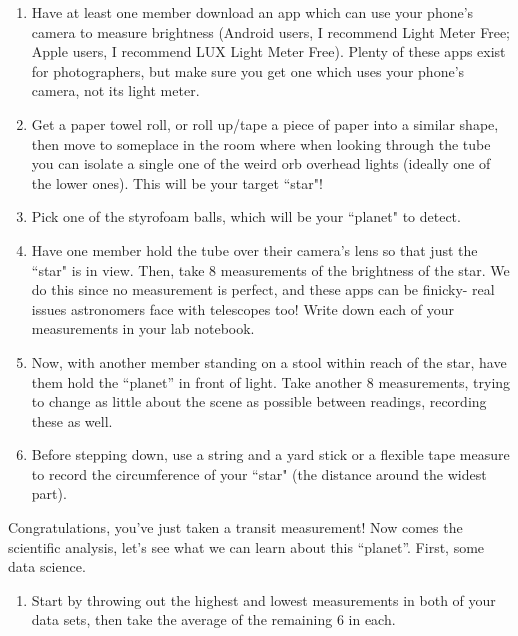 \documentclass[11pt]{article}
\begin{document}
\begin{enumerate}[label=Step \arabic*:]
    \item Have at least one member download an app which can use your phone’s camera to measure brightness (Android users, I recommend Light Meter Free; Apple users, I recommend LUX Light Meter Free). Plenty of these apps exist for photographers, but make sure you get one which uses your phone’s camera, not its light meter.
    
    \item Get a paper towel roll, or roll up/tape a piece of paper into a similar shape, then move to someplace in the room where when looking through the tube you can isolate a single one of the weird orb overhead lights (ideally one of the lower ones). This will be your target ``star"!
    
    \item Pick one of the styrofoam balls, which will be your ``planet" to detect.
    
    \item Have one member hold the tube over their camera’s lens so that just the ``star" is in view. Then, take 8 measurements of the brightness of the star. We do this since no measurement is perfect, and these apps can be finicky- real issues astronomers face with telescopes too! Write down each of your measurements in your lab notebook.
    
    \item Now, with another member standing on a stool within reach of the star, have them hold the “planet” in front of light. Take another 8 measurements, trying to change as little about the scene as possible between readings, recording these as well.
    
    \item Before stepping down, use a string and a yard stick or a flexible tape measure to record the circumference of your ``star" (the distance around the widest part).
\end{enumerate}

\noindent
Congratulations, you’ve just taken a transit measurement! Now comes the scientific analysis, let’s see what we can learn about this “planet”. First, some data science. 
\begin{enumerate}[label=Step \arabic*:,resume]
    \item Start by throwing out the highest and lowest measurements in both of your data sets, then take the average of the remaining 6 in each.
\end{enumerate}
\end{document}
